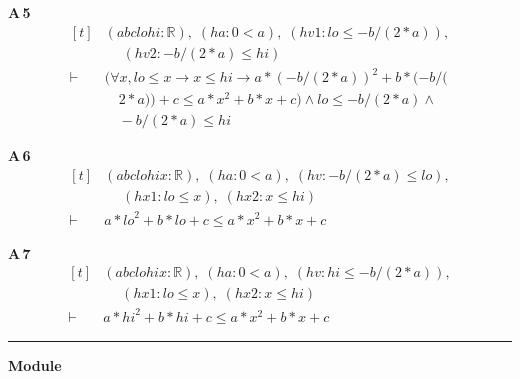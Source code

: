 \noindent\textbf{A\,5}\quad{}
{\footnotesize\[ \begin{aligned}[t]
&(\mathit{a} \mathit{b} \mathit{c} \mathit{lo} \mathit{hi} : \mathbb{R} ),\; (\mathit{ha} : 0 < \mathit{a}),\; (\mathit{hv1} : \mathit{lo} \leq -\mathit{b} / (2 * \mathit{a})),\\
&\quad \; (\mathit{hv2} : -\mathit{b} / (2 * \mathit{a}) \leq \mathit{hi})\\
\vdash\;&(\forall \mathit{x}, \mathit{lo} \leq \mathit{x} \to \mathit{x} \leq \mathit{hi} \to \mathit{a} * (-\mathit{b} / (2 * \mathit{a})) ^{2} + \mathit{b} * (-\mathit{b} / (\\
&\quad 2 * \mathit{a})) + \mathit{c} \leq \mathit{a} * \mathit{x} ^{2} + \mathit{b} * \mathit{x} + \mathit{c}) \wedge \mathit{lo} \leq -\mathit{b} / (2 * \mathit{a}) \wedge\\
&\quad -\mathit{b} / (2 * \mathit{a}) \leq \mathit{hi}
\end{aligned} \]}

\noindent\textbf{A\,6}\quad{}
{\footnotesize\[ \begin{aligned}[t]
&(\mathit{a} \mathit{b} \mathit{c} \mathit{lo} \mathit{hi} \mathit{x} : \mathbb{R} ),\; (\mathit{ha} : 0 < \mathit{a}),\; (\mathit{hv} : -\mathit{b} / (2 * \mathit{a}) \leq \mathit{lo}),\\
&\quad \; (\mathit{hx1} : \mathit{lo} \leq \mathit{x}),\; (\mathit{hx2} : \mathit{x} \leq \mathit{hi})\\
\vdash\;&\mathit{a} * \mathit{lo} ^{2} + \mathit{b} * \mathit{lo} + \mathit{c} \leq \mathit{a} * \mathit{x} ^{2} + \mathit{b} * \mathit{x} + \mathit{c}
\end{aligned} \]}

\noindent\textbf{A\,7}\quad{}
{\footnotesize\[ \begin{aligned}[t]
&(\mathit{a} \mathit{b} \mathit{c} \mathit{lo} \mathit{hi} \mathit{x} : \mathbb{R} ),\; (\mathit{ha} : 0 < \mathit{a}),\; (\mathit{hv} : \mathit{hi} \leq -\mathit{b} / (2 * \mathit{a})),\\
&\quad \; (\mathit{hx1} : \mathit{lo} \leq \mathit{x}),\; (\mathit{hx2} : \mathit{x} \leq \mathit{hi})\\
\vdash\;&\mathit{a} * \mathit{hi} ^{2} + \mathit{b} * \mathit{hi} + \mathit{c} \leq \mathit{a} * \mathit{x} ^{2} + \mathit{b} * \mathit{x} + \mathit{c}
\end{aligned} \]}

\vspace{4pt}\noindent\rule{\columnwidth}{0.4pt}\par\vspace{2pt}
\noindent\textbf{Module }\par\vspace{3pt}

